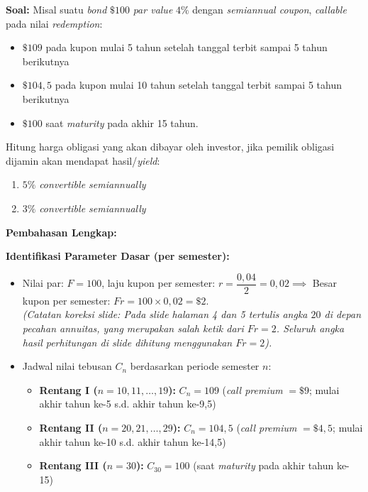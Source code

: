 \documentclass[11pt,a4paper]{article}
\begin{document}
\begin{examplebox}
\textbf{Soal:} Misal suatu \textit{bond} $\$100$ \textit{par value} $4\%$ dengan \textit{semiannual coupon}, \textit{callable} pada nilai \textit{redemption}:
\begin{itemize}[topsep=2pt, itemsep=1pt]
    \item $\$109$ pada kupon mulai 5 tahun setelah tanggal terbit sampai 5 tahun berikutnya
    \item $\$104{,}5$ pada kupon mulai 10 tahun setelah tanggal terbit sampai 5 tahun berikutnya
    \item $\$100$ saat \textit{maturity} pada akhir 15 tahun.
\end{itemize}
Hitung harga obligasi yang akan dibayar oleh investor, jika pemilik obligasi dijamin akan mendapat hasil/\textit{yield}:
\begin{enumerate}[label=\textbf{\arabic*.}, topsep=2pt, itemsep=1pt]
    \item $5\%$ \textit{convertible semiannually}
    \item $3\%$ \textit{convertible semiannually}
\end{enumerate}

\tcblower
\textbf{Pembahasan Lengkap:}

\textbf{Identifikasi Parameter Dasar (per semester):}
\begin{itemize}[topsep=2pt, itemsep=1pt]
    \item Nilai par: $F = 100$, laju kupon per semester: $r = \dfrac{0{,}04}{2} = 0{,}02 \implies$ Besar kupon per semester: $Fr = 100 \times 0{,}02 = \$2$.\\
    {\footnotesize \textit{(Catatan koreksi slide: Pada slide halaman 4 dan 5 tertulis angka $20$ di depan pecahan annuitas, yang merupakan salah ketik dari $Fr = 2$. Seluruh angka hasil perhitungan di slide dihitung menggunakan $Fr = 2$).}}
    \item Jadwal nilai tebusan $C_n$ berdasarkan periode semester $n$:
    \begin{itemize}
        \item \textbf{Rentang I ($n = 10, 11, \dots, 19$):} $C_n = 109$ (\textit{call premium} $= \$9$; mulai akhir tahun ke-5 s.d. akhir tahun ke-9,5)
        \item \textbf{Rentang II ($n = 20, 21, \dots, 29$):} $C_n = 104{,}5$ (\textit{call premium} $= \$4{,}5$; mulai akhir tahun ke-10 s.d. akhir tahun ke-14,5)
        \item \textbf{Rentang III ($n = 30$):} $C_{30} = 100$ (saat \textit{maturity} pada akhir tahun ke-15)
    \end{itemize}
\end{itemize}


\end{examplebox}
\end{document}
